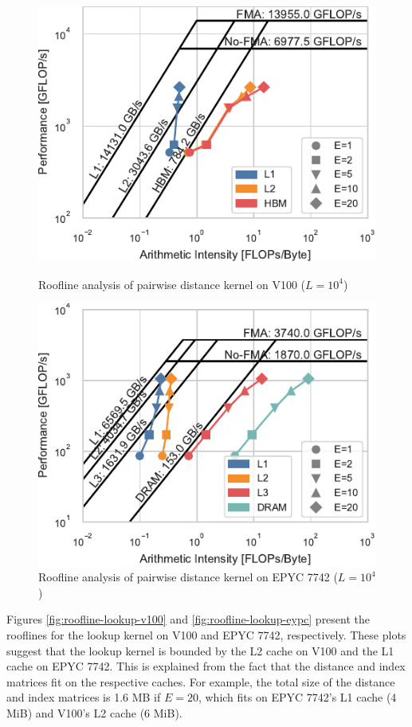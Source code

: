 \documentclass{acmart}
\begin{document}
\begin{figure}
    \centering
    \begin{minipage}{.5\textwidth}
    \includegraphics[width=.9\linewidth]{figs/roofline_distances_v100}
    \caption{Roofline analysis of pairwise distance kernel on V100 ($L=10^4$)}%
    \label{fig:roofline-distances-v100}
    \end{minipage}%
    \begin{minipage}{.5\textwidth}
    \includegraphics[width=.9\linewidth]{figs/roofline_distances_epyc}
    \caption{Roofline analysis of pairwise distance kernel on EPYC 7742 ($L=10^4$)}%
    \label{fig:roofline-distances-epyc}
    \end{minipage}%
\end{figure}

Figures \ref{fig:roofline-lookup-v100} and \ref{fig:roofline-lookup-eypc} present
the rooflines for the lookup kernel on V100 and EPYC 7742, respectively. These
plots suggest that the lookup kernel is bounded by the L2 cache on V100 and
the L1 cache on EPYC 7742. This is explained from the fact that the distance
and index matrices fit on the respective caches. For example, the total size of
the distance and index matrices is 1.6 MB if $E=20$, which fits on EPYC 7742's L1
cache (4 MiB) and V100's L2 cache (6 MiB).
\end{document}

